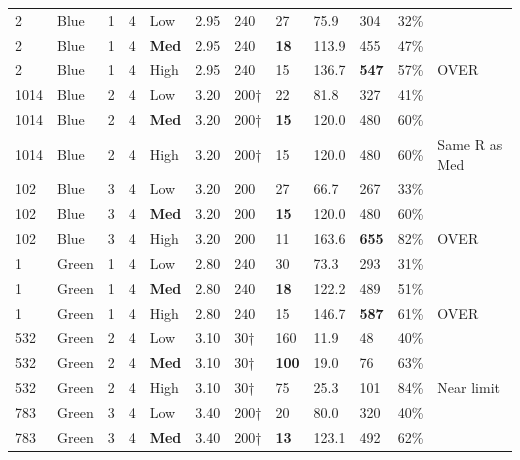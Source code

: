 \documentclass[12pt,letterpaper]{article}
\begin{document}
\begin{longtable}{C{0.6cm} L{1.0cm} C{0.5cm} C{0.5cm} C{1.0cm} C{0.8cm} C{0.9cm}
                  C{1.1cm} C{1.1cm} C{0.9cm} C{0.9cm} C{0.9cm}}
\midrule
2    & Blue   & 1 & 4 & Low  & 2.95 & 240 & 27  & 75.9 & 304 & 32\% & \\
2    & Blue   & 1 & 4 & \textbf{Med}  & 2.95 & 240 & \textbf{18} & 113.9 & 455 & 47\% & \\
2    & Blue   & 1 & 4 & High & 2.95 & 240 & 15  & 136.7 & \textcolor{warnred}{\textbf{547}} & 57\% & \textcolor{warnred}{OVER} \\
1014 & Blue   & 2 & 4 & Low  & 3.20 & 200† & 22 & 81.8 & 327 & 41\% & \\
1014 & Blue   & 2 & 4 & \textbf{Med}  & 3.20 & 200† & \textbf{15} & 120.0 & 480 & 60\% & \\
1014 & Blue   & 2 & 4 & High & 3.20 & 200† & 15  & 120.0 & 480 & 60\% & Same R as Med \\
102  & Blue   & 3 & 4 & Low  & 3.20 & 200 & 27  & 66.7 & 267 & 33\% & \\
102  & Blue   & 3 & 4 & \textbf{Med}  & 3.20 & 200 & \textbf{15} & 120.0 & 480 & 60\% & \\
102  & Blue   & 3 & 4 & High & 3.20 & 200 & 11  & 163.6 & \textcolor{warnred}{\textbf{655}} & 82\% & \textcolor{warnred}{OVER} \\
\midrule
1    & Green  & 1 & 4 & Low  & 2.80 & 240 & 30  & 73.3 & 293 & 31\% & \\
1    & Green  & 1 & 4 & \textbf{Med}  & 2.80 & 240 & \textbf{18} & 122.2 & 489 & 51\% & \\
1    & Green  & 1 & 4 & High & 2.80 & 240 & 15  & 146.7 & \textcolor{warnred}{\textbf{587}} & 61\% & \textcolor{warnred}{OVER} \\
532  & Green  & 2 & 4 & Low  & 3.10 & 30† & 160 & 11.9 & 48  & 40\% & \\
532  & Green  & 2 & 4 & \textbf{Med}  & 3.10 & 30† & \textbf{100} & 19.0 & 76  & 63\% & \\
532  & Green  & 2 & 4 & High & 3.10 & 30† & 75  & 25.3 & 101 & 84\% & Near limit \\
783  & Green  & 3 & 4 & Low  & 3.40 & 200† & 20 & 80.0 & 320 & 40\% & \\
783  & Green  & 3 & 4 & \textbf{Med}  & 3.40 & 200† & \textbf{13} & 123.1 & 492 & 62\% & \\

\end{longtable}
\end{document}
